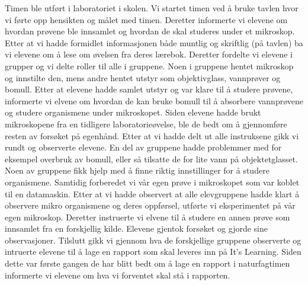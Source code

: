 \documentclass[main.tex]{subfiles}
\begin{document}
Timen ble utført i laboratoriet i skolen. Vi startet timen ved å bruke tavlen hvor vi førte opp
hensikten og målet med timen. Deretter informerte vi elevene om hvordan prøvene ble innsamlet
og hvordan de skal studeres under et mikroskop. Etter at vi hadde formidlet informasjonen både
muntlig og skriftlig (på tavlen) ba vi elevene om å lese om øvelsen fra deres lærebok. Deretter
fordelte vi elevene i grupper og vi delte roller til alle i gruppene. Noen i gruppene hentet
mikroskop og innstilte den, mens andre hentet utstyr som objektivglass, vannprøver og bomull.
Etter at elevene hadde samlet utstyr og var klare til å studere prøvene, informerte vi elvene
om hvordan de kan bruke bomull til å absorbere vannprøvene og studere organismene under mikroskopet.
Siden elevene hadde brukt mikroskopene fra en tidligere laboratorieøvelse, ble de bedt om å 
gjennomføre resten av forsøket på egenhånd. Etter at vi hadde delt ut alle instruksene gikk vi
rundt og observerte elevene. En del av gruppene hadde problemmer med for eksempel overbruk av bomull, 
eller så tilsatte de for lite vann på objektetglasset. Noen av gruppene fikk hjelp med å finne 
riktig innstillinger for å studere organismene. Samtidig forberedet vi vår egen prøve i mikroskopet 
som var koblet til en datamaskin. Etter at vi hadde observert at alle elevgruppene hadde klart å 
observere mikro organismene og deres oppførsel, utførte vi eksperimentet på vår egen mikroskop.
Deretter instruerte vi elvene til å studere en annen prøve som innsamlet fra en forskjellig kilde.
Elevene gjentok forsøket og gjorde sine observasjoner. Tilslutt gikk vi gjennom hva de forskjellige
gruppene observerte og intruerte elevene til å lage en rapport som skal leveres inn på It's Learning.
Siden dette var første gangen de har blitt bedt om å lage en rapport i naturfagtimen informerte vi 
elevene om hva vi forventet skal stå i rapporten.
\end{document}
